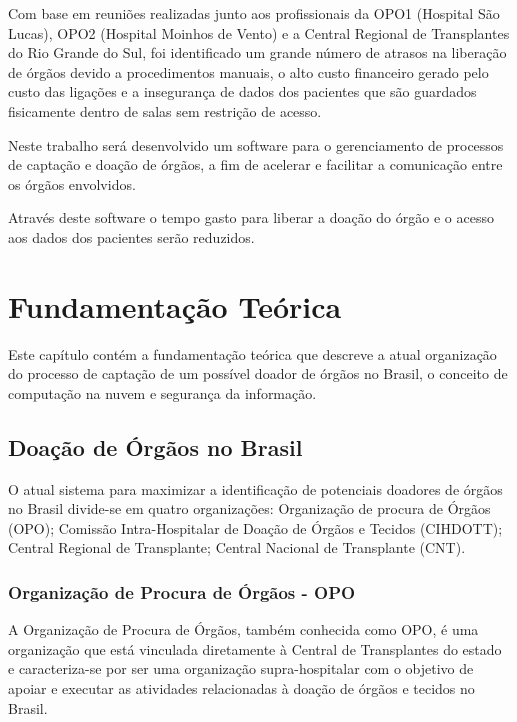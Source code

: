 \documentclass[portuguese,oneside]{tcc}
\begin{document}
Com base em reuniões realizadas junto aos profissionais da OPO1 (Hospital São Lucas), OPO2 (Hospital Moinhos de Vento) e a Central Regional de Transplantes do Rio Grande do Sul, foi identificado um grande número de atrasos na liberação de órgãos devido a procedimentos manuais, o alto custo financeiro gerado pelo custo das ligações e a insegurança de dados dos pacientes que são guardados fisicamente dentro de salas sem restrição de acesso.

Neste trabalho será desenvolvido um software para o gerenciamento de processos de captação e doação de órgãos, a fim de acelerar e facilitar a comunicação entre os órgãos envolvidos.

Através deste software o tempo gasto para liberar a doação do órgão e o acesso aos dados dos pacientes serão reduzidos.

\chapter{Fundamentação Teórica}
Este capítulo contém a fundamentação teórica que descreve a atual organização do processo de captação de um possível doador de órgãos no Brasil, o conceito de computação na nuvem e segurança da informação.

\section{Doação de Órgãos no Brasil}

O atual sistema para maximizar a identificação de potenciais doadores de órgãos no Brasil divide-se em quatro organizações: Organização de procura de Órgãos (OPO); Comissão Intra-Hospitalar de Doação de Órgãos e Tecidos (CIHDOTT); Central Regional de Transplante; Central Nacional de Transplante (CNT).

\subsection{Organização de Procura de Órgãos - OPO}
A Organização de Procura de Órgãos, também conhecida como OPO, é uma organização que está vinculada diretamente à Central de Transplantes do estado e caracteriza-se por ser uma organização supra-hospitalar com o objetivo de apoiar e executar as atividades relacionadas à doação de órgãos e tecidos no Brasil.
\end{document}

